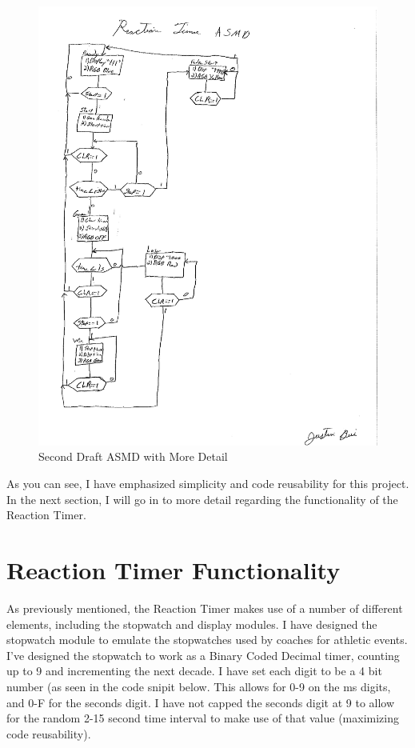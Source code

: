 \documentclass{article}
\begin{document}
\begin{figure}
	\includegraphics[width=.9\linewidth]{pdfs/reaction_timer_asmd_v2.pdf}
	\caption{Second Draft ASMD with More Detail}
	\label{fig:ASMD2}
\end{figure}

As you can see, I have emphasized simplicity and code reusability for this project. In the next section, I will go in to more detail regarding the functionality of the Reaction Timer.

\newpage

\section{Reaction Timer Functionality}
As previously mentioned, the Reaction Timer makes use of a number of different elements, including the stopwatch and display modules. I have designed the stopwatch module to emulate the stopwatches used by coaches for athletic events. I've designed the stopwatch to work as a Binary Coded Decimal timer, counting up to 9 and incrementing the next decade. I have set each digit to be a 4 bit number (as seen in the code snipit below. This allows for 0-9 on the ms digits, and 0-F for the seconds digit. I have not capped the seconds digit at 9 to allow for the random 2-15 second time interval to make use of that value (maximizing code reusability).
\end{document}
